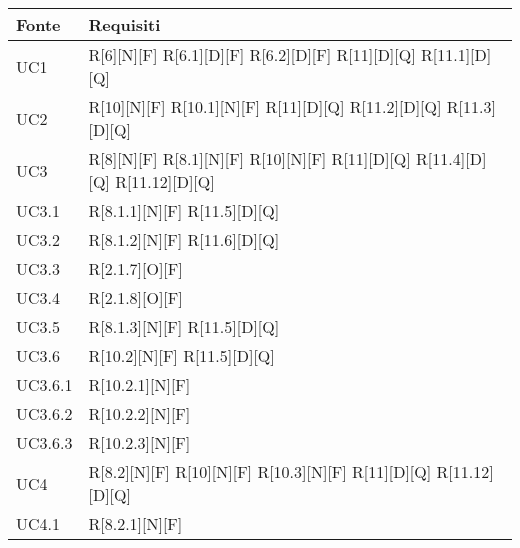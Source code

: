 
\begin{longtable}{X | X}  
			\rowcolor{orange!85}Fonte & Requisiti \\
\endhead
		UC1 & 
		R[6][N][F] \newline
		R[6.1][D][F] \newline
		R[6.2][D][F]  \newline
		R[11][D][Q]\newline
		R[11.1][D][Q] \\
		\hline
		UC2 & 
		R[10][N][F] \newline
		R[10.1][N][F] \newline
		R[11][D][Q] \newline
		R[11.2][D][Q] \newline
		R[11.3][D][Q] \\
		\hline
		UC3 &
		 R[8][N][F] \newline
		 R[8.1][N][F] \newline
		 R[10][N][F] \newline 
		 R[11][D][Q] \newline
		 R[11.4][D][Q] \newline
		 R[11.12][D][Q]\\
		\hline
		UC3.1 &
			R[8.1.1][N][F] \newline
			R[11.5][D][Q] \\
		\hline
		UC3.2 & 
		R[8.1.2][N][F] \newline
		R[11.6][D][Q] \\
		\hline
		UC3.3 &
		R[2.1.7][O][F] \\
		\hline
		UC3.4 &
		R[2.1.8][O][F] \\
		\hline
		UC3.5 &
		R[8.1.3][N][F] \newline
		R[11.5][D][Q] \\
		\hline
		UC3.6 & 
		R[10.2][N][F] \newline
		R[11.5][D][Q] \\
		\hline
		UC3.6.1 & 
		R[10.2.1][N][F] \\
		\hline
		UC3.6.2 &
		R[10.2.2][N][F] \\
		\hline
		UC3.6.3 & 
		R[10.2.3][N][F] \\
		\hline
		UC4 & 
		R[8.2][N][F] \newline
		R[10][N][F] \newline
		R[10.3][N][F] \newline
		R[11][D][Q] \newline
		 R[11.12][D][Q]\\
		\hline
		UC4.1 &
		R[8.2.1][N][F] \newline

\end{longtable}
